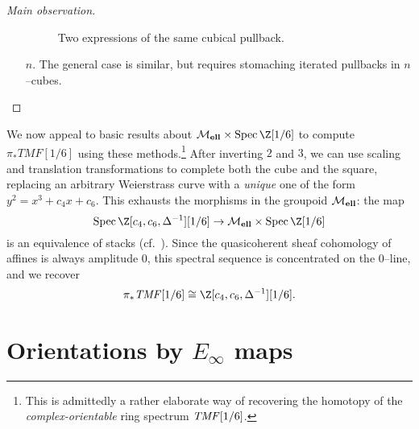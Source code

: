 \begin{proof}[Main observation]
\begin{enumerate}
\begin{figure}
\begin{center}
    \end{center}
    \caption{Two expressions of the same cubical pullback.}\label{HypercubesFigure}
\end{figure}
    \item[$n$.] The general case is similar, but requires stomaching iterated pullbacks in $n$--cubes. \qedhere
\end{enumerate}
\end{proof}

\begin{example}
We now appeal to basic results about $\moduli{ell} \times \Spec \Z[1/6]$ to compute $\pi_* TMF[1/6]$ using these methods.\footnote{This is admittedly a rather elaborate way of recovering the homotopy of the \emph{complex-orientable} ring spectrum $\mathit{TMF}[1/6]$.}  After inverting $2$ and $3$, we can use scaling and translation transformations to complete both the cube and the square, replacing an arbitrary Weierstrass curve with a \emph{unique} one of the form $y^2 = x^3 + c_4 x + c_6$.  This exhausts the morphisms in the groupoid $\mathcal{M}_{\mathbf{ell}}$: the map \[\Spec \Z[c_4, c_6, \Delta^{-1}][1/6] \to \moduli{ell} \times \Spec \Z[1/6]\] is an equivalence of stacks (cf.\ ).  Since the quasicoherent sheaf cohomology of affines is always amplitude $0$, this spectral sequence is concentrated on the $0$--line, and we recover \[\pi_* \TMF[1/6] \cong \Z[c_4, c_6, \Delta^{-1}][1/6].\]
\end{example}




















\section{Orientations by \texorpdfstring{$E_\infty$}{Eoo} maps}\label{JuvitopTalkSection}


